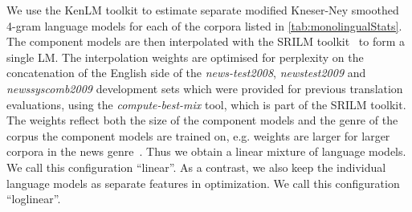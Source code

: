 We use the KenLM toolkit to
estimate separate modified Kneser-Ney smoothed 4-gram
language models for each of the
corpora listed in \autoref{tab:monolingualStats}. The component models are then
interpolated with the SRILM toolkit~\citep{stolcke:2002:SLP} to form a single LM.
The interpolation weights are optimised for perplexity on the
concatenation of the English side of the \emph{news-test2008},
\emph{newstest2009} and \emph{newssyscomb2009} development sets which were provided
for previous translation evaluations, using
the \emph{compute-best-mix} tool, which is part of the SRILM toolkit.
The weights reflect
both the size of the component models and the genre of the corpus the component models
are trained on, e.g. weights are larger for larger corpora in the news
genre~\citep{foster-chen-kuhn:2013:MTSummit}.
Thus we obtain a linear mixture of language models. We call this configuration ``linear''.
As a contrast, we also keep the individual language models as separate features
in optimization. We call this configuration ``loglinear''.

